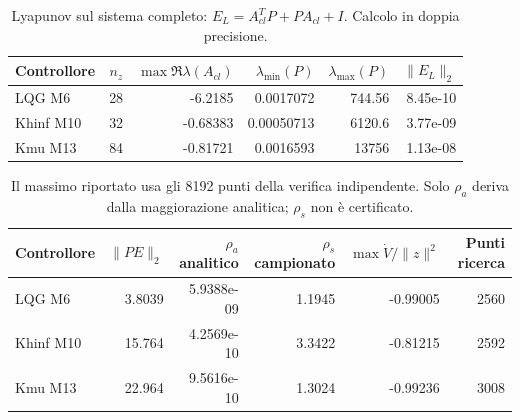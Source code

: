 \begin{table}[H]\centering\small
\begin{tabular}{lrrrrr}\toprule
Controllore & $n_z$ & $\max\Re\lambda(A_{cl})$ & $\lambda_{\min}(P)$ & $\lambda_{\max}(P)$ & $\|E_L\|_2$ \\
\midrule
LQG M6 & 28 & -6.2185 & 0.0017072 & 744.56 & 8.45e-10 \\
Khinf M10 & 32 & -0.68383 & 0.00050713 & 6120.6 & 3.77e-09 \\
Kmu M13 & 84 & -0.81721 & 0.0016593 & 13756 & 1.13e-08 \\
\bottomrule\end{tabular}
\caption{Lyapunov sul sistema completo: $E_L=A_{cl}^TP+PA_{cl}+I$. Calcolo in doppia precisione.}
\end{table}
\begin{table}[H]\centering\small
\begin{tabular}{lrrrrr}\toprule
Controllore & $\|PE\|_2$ & $\rho_a$ analitico & $\rho_s$ campionato & $\max\dot V/\|z\|^2$ & Punti ricerca \\
\midrule
LQG M6 & 3.8039 & 5.9388e-09 & 1.1945 & -0.99005 & 2560 \\
Khinf M10 & 15.764 & 4.2569e-10 & 3.3422 & -0.81215 & 2592 \\
Kmu M13 & 22.964 & 9.5616e-10 & 1.3024 & -0.99236 & 3008 \\
\bottomrule\end{tabular}
\caption{Il massimo riportato usa gli 8192 punti della verifica indipendente. Solo $\rho_a$ deriva dalla maggiorazione analitica; $\rho_s$ non \`e certificato.}
\end{table}
